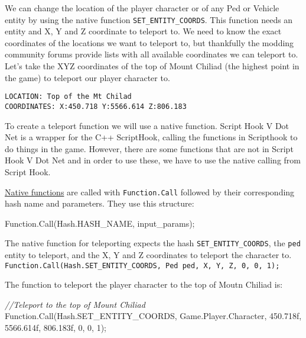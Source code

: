 \documentclass[
  openany]{book}
\newenvironment{Shaded}{\begin{snugshade}}{\end{snugshade}}
\newcommand{\CommentTok}[1]{\textcolor[rgb]{0.56,0.35,0.01}{\textit{#1}}}
\newcommand{\DecValTok}[1]{\textcolor[rgb]{0.00,0.00,0.81}{#1}}
\newcommand{\FloatTok}[1]{\textcolor[rgb]{0.00,0.00,0.81}{#1}}
\newcommand{\FunctionTok}[1]{\textcolor[rgb]{0.00,0.00,0.00}{#1}}
\newcommand{\NormalTok}[1]{#1}
\begin{document}
We can change the location of the player character or of any Ped or Vehicle entity by using the native function \texttt{SET\_ENTITY\_COORDS}. This function needs an entity and X, Y and Z coordinate to teleport to.
We need to know the exact coordinates of the locations we want to teleport to, but thankfully the modding community forums provide lists with all available coordinates we can teleport to. Let's take the XYZ coordinates of the top of Mount Chiliad (the highest point in the game) to teleport our player character to.

\begin{verbatim}
LOCATION: Top of the Mt Chilad
COORDINATES: X:450.718 Y:5566.614 Z:806.183
\end{verbatim}

To create a teleport function we will use a native function. Script Hook V Dot Net is a wrapper for the C++ ScriptHook, calling the functions in Scripthook to do things in the game. However, there are some functions that are not in Script Hook V Dot Net and in order to use these, we have to use the native calling from Script Hook.

\href{https://nitanmarcel.github.io/shvdn-docs.github.io/namespace_g_t_a_1_1_native.html\#a84977424e1cb7b6f1c2902770bf9ad2d}{Native functions} are called with \texttt{Function.Call} followed by their corresponding hash name and parameters. They use this structure:

\begin{Shaded}
\begin{Highlighting}[]
\NormalTok{Function.}\FunctionTok{Call}\NormalTok{(Hash.}\FunctionTok{HASH_NAME}\NormalTok{, input_params);}
\end{Highlighting}
\end{Shaded}

The native function for teleporting expects the hash \texttt{SET\_ENTITY\_COORDS}, the \texttt{ped} entity to teleport, and the X, Y and Z coordinates to teleport the character to. \texttt{Function.Call(Hash.SET\_ENTITY\_COORDS,\ Ped\ ped,\ X,\ Y,\ Z,\ 0,\ 0,\ 1);}

The function to teleport the player character to the top of Moutn Chiliad is:

\begin{Shaded}
\begin{Highlighting}[]
\CommentTok{//Teleport to the top of Mount Chiliad}
\NormalTok{Function.}\FunctionTok{Call}\NormalTok{(Hash.}\FunctionTok{SET_ENTITY_COORDS}\NormalTok{, Game.}\FunctionTok{Player}\NormalTok{.}\FunctionTok{Character}\NormalTok{, }\FloatTok{450.718f}\NormalTok{, }\FloatTok{5566.614f}\NormalTok{, }\FloatTok{806.183f}\NormalTok{, }\DecValTok{0}\NormalTok{, }\DecValTok{0}\NormalTok{, }\DecValTok{1}\NormalTok{);}
\end{Highlighting}
\end{Shaded}
\end{document}
